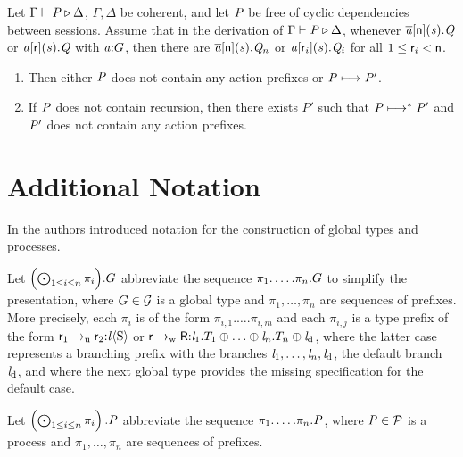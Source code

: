 \begin{theorem}
	\label{thm:progress}
	Let $ \Gamma \vdash \PT \triangleright \Delta $, $ \Gamma, \Delta $ be coherent, and let $ \PT $ be free of cyclic dependencies between sessions.
	Assume that in the derivation of $ \Gamma \vdash \PT \triangleright \Delta $, whenever $ \PReq{\Chan[a]}{\Role[n]}{\Chan}{\PT[Q]} $ or $ \PAcc{\Chan[a]}{\Role}{\Chan}{\PT[Q]} $ with $ \Typed{\Chan[a]}{\GT} $, then there are $ \PReq{\Chan[a]}{\Role[n]}{\Chan}{\PT[Q]_n} $ or $ \PAcc{\Chan[a]}{\Role_i}{\Chan}{\PT[Q]_i} $ for all $ 1 \leq \Role_i < \Role[n] $.
	\begin{enumerate}
		\item Then either $ \PT $ does not contain any action prefixes or $ \PT \step \PT' $.
		\item If $ \PT $ does not contain recursion, then there exists $ P' $ such that $ \PT \steps \PT' $ and $ \PT' $ does not contain any action prefixes.
	\end{enumerate}
\end{theorem}

\section{Additional Notation}
In \cite{PetersEtal21} the authors introduced notation for the construction of global types and processes.

Let $ {\left( \bigodot_{1 \leq i \leq n} \pi_i \right)}.\GT $ abbreviate the sequence $ \pi_1.\ldots.\pi_n.\GT $ to simplify the presentation, where $ \GT \in \globalTypes $ is a global type and $ \pi_1, \ldots, \pi_n $ are sequences of prefixes. More precisely, each $ \pi_i $ is of the form $ \pi_{i, 1}.\ldots.\pi_{i, m} $ and each $ \pi_{i, j} $ is a type prefix of the form $ \GComUS{\Role_1}{\Role_2}{\Label}{\Sort} $ or $ \GBranW{\Role}{\Role[R]}{\Label_1.\LT_1 \oplus \ldots \oplus \Label_n.\LT_n \oplus \LabelD} $, where the latter case represents a \weakR branching prefix with the branches $ \Label_1, \ldots, \Label_n, \LabelD $, the default branch $ \LabelD $, and where the next global type provides the missing specification for the default case.

Let $ \left( \bigodot_{1 \leq i \leq n} \pi_i \right).\PT $ abbreviate the sequence $ \pi_1.\ldots.\pi_n.\PT $, where $ \PT \in \processes $ is a process and $ \pi_1, \ldots, \pi_n $ are sequences of prefixes.

